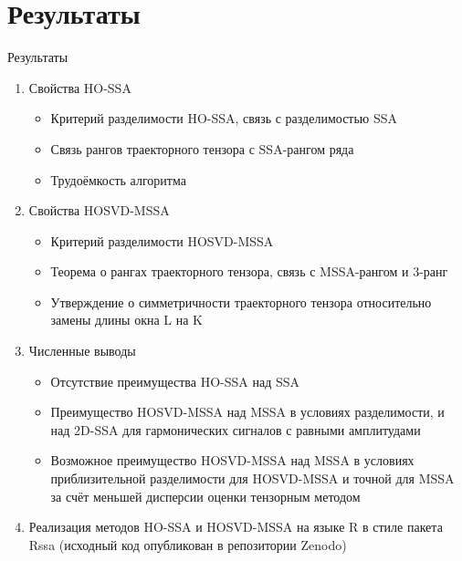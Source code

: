 \documentclass[pdf, unicode, 9pt, notheorems, handout]{beamer}
\begin{document}
    
    \section{Результаты}\label{sec:results}
    \begin{frame}{Результаты}
        \begin{enumerate}
            \item Свойства HO-SSA
            \begin{itemize}
                \item Критерий разделимости HO-SSA, связь с разделимостью SSA
                \item Связь рангов траекторного тензора с SSA-рангом ряда
                \item Трудоёмкость алгоритма
            \end{itemize}
            \item Свойства HOSVD-MSSA
            \begin{itemize}
                \item Критерий разделимости HOSVD-MSSA
                \item Теорема о рангах траекторного тензора, связь с MSSA-рангом и 3-ранг
                \item Утверждение о симметричности траекторного тензора относительно замены длины окна L на K
            \end{itemize}
            \item Численные выводы
            \begin{itemize}
                \item Отсутствие преимущества HO-SSA над SSA
                \item Преимущество HOSVD-MSSA над MSSA в условиях разделимости, и над 2D-SSA для гармонических сигналов с равными амплитудами
                \item Возможное преимущество HOSVD-MSSA над MSSA в условиях приблизительной разделимости для HOSVD-MSSA и точной для MSSA за счёт меньшей дисперсии оценки тензорным методом
            \end{itemize}
            \item Реализация методов HO-SSA и HOSVD-MSSA на языке R в стиле пакета Rssa (исходный код опубликован в 
            репозитории Zenodo)
        \end{enumerate}
    \end{frame}
\end{document}
